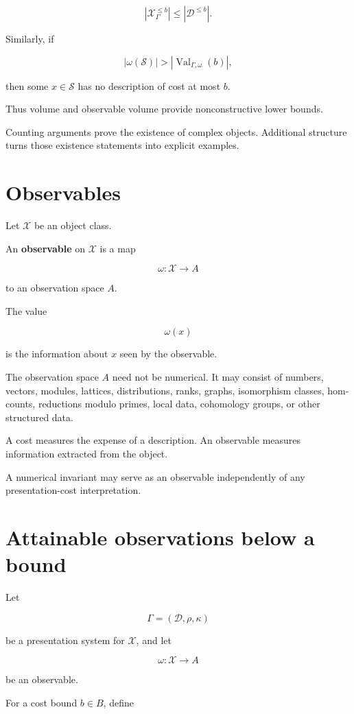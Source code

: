 \documentclass[11pt]{article}
\begin{document}
\[
|\mathcal X_\Gamma^{\leq b}|
\leq
|\mathcal D^{\leq b}|.
\]

Similarly, if

\[
|\omega(\mathcal S)|>|\operatorname{Val}_{\Gamma,\omega}(b)|,
\]

then some \(x\in\mathcal S\) has no description of cost at most \(b\).

Thus volume and observable volume provide nonconstructive lower bounds.

Counting arguments prove the existence of complex objects. Additional structure turns those existence statements into explicit examples.


\section{Observables}

Let \(\mathcal X\) be an object class.

An \textbf{observable} on \(\mathcal X\) is a map

\[
\omega:\mathcal X\to A
\]

to an observation space \(A\).

The value

\[
\omega(x)
\]

is the information about \(x\) seen by the observable.

The observation space \(A\) need not be numerical. It may consist of numbers, vectors, modules, lattices, distributions, ranks, graphs, isomorphism classes, hom-counts, reductions modulo primes, local data, cohomology groups, or other structured data.

A cost measures the expense of a description. An observable measures information extracted from the object.

A numerical invariant may serve as an observable independently of any presentation-cost interpretation.


\section{Attainable observations below a bound}

Let

\[
\Gamma=(\mathcal D,\rho,\kappa)
\]

be a presentation system for \(\mathcal X\), and let

\[
\omega:\mathcal X\to A
\]

be an observable.

For a cost bound \(b\in B\), define
\end{document}
